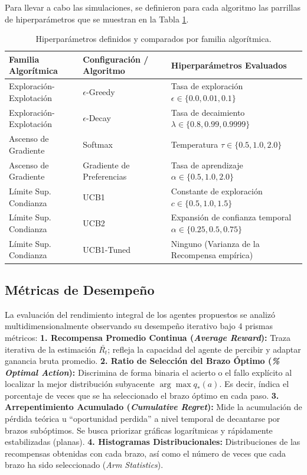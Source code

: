 Para llevar a cabo las simulaciones, se definieron para cada algoritmo las
parrillas de hiperparámetros que se muestran en la Tabla \ref{tab:Parametros}.

\begin{table}[t]
\centering
\caption{Hiperparámetros definidos y comparados por familia algorítmica.}
\label{tab:Parametros}
\begin{tabular}{|l|l|l|}
\hline
\textbf{Familia Algorítmica} & \textbf{Configuración / Algoritmo} & \textbf{Hiperparámetros Evaluados} \\ \hline
Exploración-Explotación & $\epsilon$-Greedy & Tasa de exploración $\epsilon \in \{0.0, 0.01, 0.1\}$ \\ \hline
Exploración-Explotación & $\epsilon$-Decay & Tasa de decaimiento $\lambda \in \{0.8, 0.99, 0.9999\}$ \\ \hline
Ascenso de Gradiente & Softmax & Temperatura $\tau \in \{0.5, 1.0, 2.0\}$ \\ \hline
Ascenso de Gradiente & Gradiente de Preferencias & Tasa de aprendizaje $\alpha \in \{0.5, 1.0, 2.0\}$ \\ \hline
Límite Sup. Condianza & UCB1 & Constante de exploración $c \in \{0.5, 1.0, 1.5\}$ \\ \hline
Límite Sup. Condianza & UCB2 & Expansión de confianza temporal $\alpha \in \{0.25, 0.5, 0.75\}$ \\ \hline
Límite Sup. Condianza & UCB1-Tuned & Ninguno (Varianza de la Recompensa empírica) \\ \hline
\end{tabular}
\end{table}

\subsection{Métricas de
Desempeño}\label{muxe9tricas-de-desempeuxf1o}

La evaluación del rendimiento integral de los agentes propuestos se
analizó multidimensionalmente observando su desempeño iterativo bajo 4
prismas métricos: \textbf{1. Recompensa Promedio Continua (\emph{Average
Reward}):} Traza iterativa de la estimación \(\bar{R_t}\); refleja la
capacidad del agente de percibir y adaptar ganancia bruta promedio. \textbf{2.
Ratio de Selección del Brazo Óptimo (\emph{\% Optimal Action}):}
Discrimina de forma binaria el acierto o el fallo explícito al localizar
la mejor distribución subyacente \(\arg\max q_*(a)\). Es decir, índica el porcentaje de veces que se ha seleccionado el brazo óptimo en cada paso. 
\textbf{3. Arrepentimiento Acumulado (\emph{Cumulative Regret}):} Mide la
acumulación de pérdida teórica u ``oportunidad perdida'' a nivel
temporal de decantarse por brazos subóptimos. Se busca priorizar gráficas logarítmicas y rápidamente estabilizadas (planas). \textbf{4. Histogramas Distribucionales:}
Distribuciones de las recompensas obtenidas con cada brazo, así como el número de veces que cada brazo ha sido seleccionado (\emph{Arm Statistics}).

